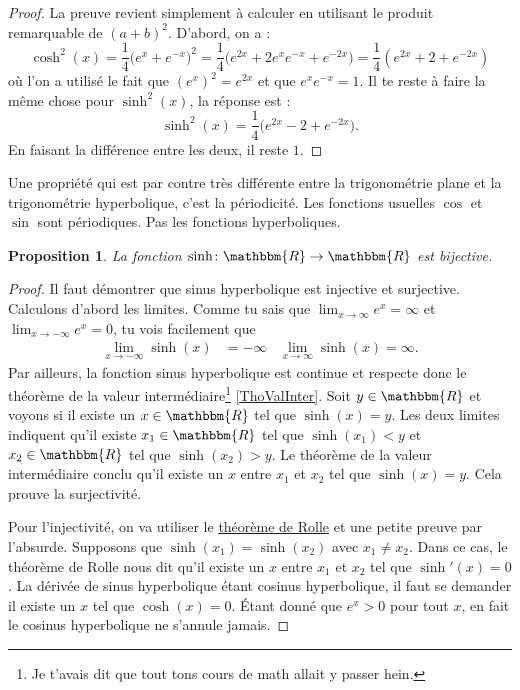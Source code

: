 \documentclass[a4paper,12pt]{book}
\newcommand{\eR}{\mathbbm{R}}
\newcounter{numtho}
\theoremstyle{mes_exemples}	\newtheorem{exemple}[numtho]{Exemple}
\theoremstyle{mes_tho}
\newtheorem{proposition}[numtho]{Proposition}
\begin{document}
\begin{proof}
La preuve revient simplement à calculer en utilisant le produit remarquable de $(a+b)^2$. D'abord, on a :
\[ 
  \cosh^2(x)=\frac{1}{ 4 }\big(  e^{x}+ e^{-x} \big)^2=\frac{1}{ 4 }\big(  e^{2x}+2 e^{x} e^{-x}+ e^{-2x} \big)=\frac{1}{ 4 }( e^{2x}+2+ e^{-2x})
\]
où l'on a utilisé le fait que $(e^{x})^2= e^{2x}$ et que $ e^{x} e^{-x}=1$. Il te reste à faire la même chose pour $\sinh^2(x)$, la réponse est :
\[ 
  \sinh^2(x)=\frac{1}{ 4 }\big(  e^{2x}-2+ e^{-2x} \big).
\]
En faisant la différence entre les deux, il reste $1$.
\end{proof}
Une propriété qui est par contre très différente entre la trigonométrie plane et la trigonométrie hyperbolique, c'est la périodicité. Les fonctions usuelles $\cos$ et $\sin$ sont périodiques. Pas les fonctions hyperboliques.

\begin{proposition}
La fonction $\sinh\colon \eR\to\eR $ est bijective.
\end{proposition}

\begin{proof}
Il faut démontrer que sinus hyperbolique est injective et surjective. Calculons d'abord les limites. Comme tu sais que $\lim_{x\to\infty} e^{x}=\infty$ et $\lim_{x\to-\infty} e^{x}=0$, tu vois facilement que
\begin{align}
\lim_{x\to-\infty}\sinh(x)&=-\infty	&\lim_{x\to\infty}\sinh(x)=\infty.
\end{align}
Par ailleurs, la fonction sinus hyperbolique est continue et respecte donc le théorème de la valeur intermédiaire\footnote{Je t'avais dit que tout tons cours de math allait y passer hein.} \ref{ThoValInter}. Soit $y\in\eR$ et voyons si il existe un $x\in\eR$ tel que $\sinh(x)=y$. Les deux limites indiquent qu'il existe $x_1\in\eR$ tel que $\sinh(x_1)<y$ et $x_2\in\eR$ tel que $\sinh(x_2)>y$. Le théorème de la valeur intermédiaire conclu qu'il existe un $x$ entre $x_1$ et $x_2$ tel que $\sinh(x)=y$. Cela prouve la surjectivité.

Pour l'injectivité, on va utiliser le \href{http://fr.wikipedia.org/wiki/Théorème_de_Rolle}{théorème de Rolle} et une petite preuve par l'absurde. Supposons que $\sinh(x_1)=\sinh(x_2)$ avec $x_1\neq x_2$. Dans ce cas, le théorème de Rolle nous dit qu'il existe un $x$ entre $x_1$ et $x_2$ tel que $\sinh'(x)=0$. La dérivée de sinus hyperbolique étant cosinus hyperbolique, il faut se demander il existe un $x$ tel que $\cosh(x)=0$. Étant donné que $ e^{x}>0$ pour tout $x$, en fait le cosinus hyperbolique ne s'annule jamais.

\end{proof}
\end{document}
